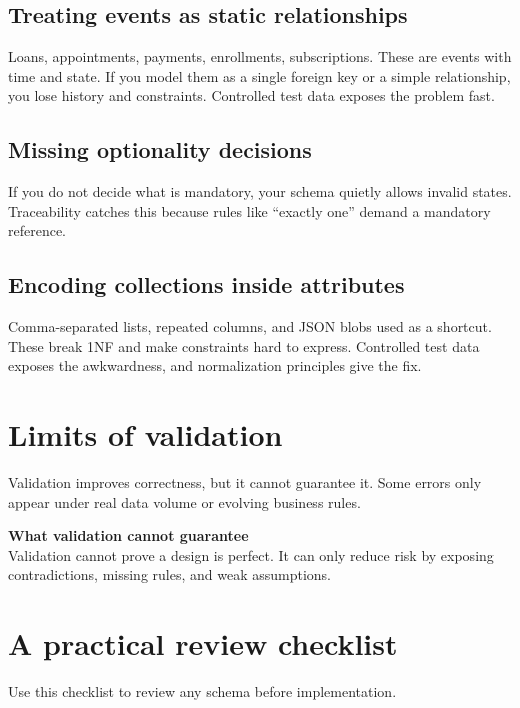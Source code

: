 \subsection{Treating events as static relationships}
Loans, appointments, payments, enrollments, subscriptions.
These are events with time and state.
If you model them as a single foreign key or a simple relationship, you lose history and constraints.
Controlled test data exposes the problem fast.

\subsection{Missing optionality decisions}
If you do not decide what is mandatory, your schema quietly allows invalid states.
Traceability catches this because rules like “exactly one” demand a mandatory reference.

\subsection{Encoding collections inside attributes}
Comma-separated lists, repeated columns, and JSON blobs used as a shortcut.
These break 1NF and make constraints hard to express.
Controlled test data exposes the awkwardness, and normalization principles give the fix.

\section{Limits of validation}
Validation improves correctness, but it cannot guarantee it.
Some errors only appear under real data volume or evolving business rules.

\begin{notebox}
\textbf{What validation cannot guarantee}\\
Validation cannot prove a design is perfect.
It can only reduce risk by exposing contradictions, missing rules, and weak assumptions.
\end{notebox}

\section{A practical review checklist}
Use this checklist to review any schema before implementation.

